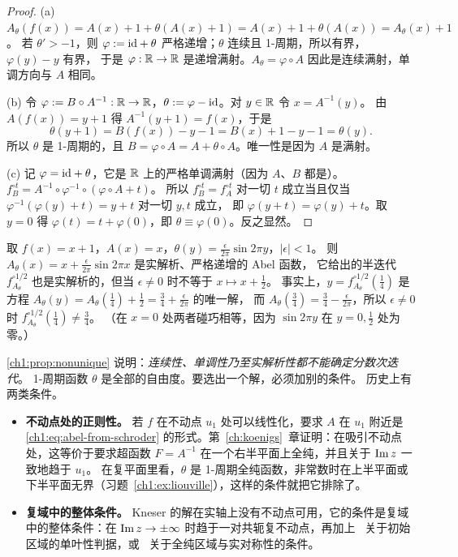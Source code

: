 \begin{proof}
(a) $A_\theta(f(x))=A(x)+1+\theta(A(x)+1)=A(x)+1+\theta(A(x))=A_\theta(x)+1$。
若 $\theta'>-1$，则 $\varphi:=\mathrm{id}+\theta$ 严格递增；$\theta$ 连续且 1-周期，所以有界，$\varphi(y)-y$ 有界，
于是 $\varphi:\mathbb{R}\to\mathbb{R}$ 是递增满射。$A_\theta=\varphi\circ A$ 因此是连续满射，单调方向与 $A$ 相同。

(b) 令 $\varphi:=B\circ A^{-1}:\mathbb{R}\to\mathbb{R}$，$\theta:=\varphi-\mathrm{id}$。对 $y\in\mathbb{R}$ 令 $x=A^{-1}(y)$。
由 $A(f(x))=y+1$ 得 $A^{-1}(y+1)=f(x)$，于是
\[
  \theta(y+1)=B(f(x))-y-1=B(x)+1-y-1=\theta(y).
\]
所以 $\theta$ 是 1-周期的，且 $B=\varphi\circ A=A+\theta\circ A$。唯一性是因为 $A$ 是满射。

(c) 记 $\varphi=\mathrm{id}+\theta$，它是 $\mathbb{R}$ 上的严格单调满射（因为 $A$、$B$ 都是）。
$f_B^{\circ t}=A^{-1}\circ\varphi^{-1}\circ(\varphi\circ A+t)$。
所以 $f_B^{\circ t}=f_A^{\circ t}$ 对一切 $t$ 成立当且仅当 $\varphi^{-1}(\varphi(y)+t)=y+t$ 对一切 $y,t$ 成立，
即 $\varphi(y+t)=\varphi(y)+t$。取 $y=0$ 得 $\varphi(t)=t+\varphi(0)$，即 $\theta\equiv\varphi(0)$。反之显然。
\end{proof}

\begin{example}[平移的非平凡半迭代]\label{ch1:ex:translation}
取 $f(x)=x+1$，$A(x)=x$，$\theta(y)=\frac{\epsilon}{2\pi}\sin2\pi y$，$|\epsilon|<1$。
则 $A_\theta(x)=x+\frac{\epsilon}{2\pi}\sin2\pi x$ 是实解析、严格递增的 Abel 函数，
它给出的半迭代 $f_{A_\theta}^{\circ1/2}$ 也是实解析的，但当 $\epsilon\ne0$ 时不等于 $x\mapsto x+\frac12$。
事实上，$y=f_{A_\theta}^{\circ1/2}(\tfrac14)$ 是方程 $A_\theta(y)=A_\theta(\tfrac14)+\tfrac12=\tfrac34+\frac{\epsilon}{2\pi}$ 的唯一解，
而 $A_\theta(\tfrac34)=\tfrac34-\frac{\epsilon}{2\pi}$，所以 $\epsilon\ne0$ 时 $f_{A_\theta}^{\circ1/2}(\tfrac14)\ne\tfrac34$。
（在 $x=0$ 处两者碰巧相等，因为 $\sin2\pi y$ 在 $y=0,\frac12$ 处为零。）
\end{example}

\cref{ch1:prop:nonunique} 说明：\emph{连续性、单调性乃至实解析性都不能确定分数次迭代}。
1-周期函数 $\theta$ 是全部的自由度。要选出一个解，必须加别的条件。
历史上有两类条件。
\begin{itemize}
\item \textbf{不动点处的正则性。} 若 $f$ 在不动点 $u_1$ 处可以线性化，要求 $A$ 在 $u_1$ 附近是 \eqref{ch1:eq:abel-from-schroder} 的形式。第~\ref{ch:koenigs}~章证明：在吸引不动点处，这等价于要求超函数 $F=A^{-1}$ 在一个右半平面上全纯，并且关于 $\operatorname{Im} z$ 一致地趋于 $u_1$。
  在复平面里看，$\theta$ 是 1-周期全纯函数，非常数时在上半平面或下半平面无界（习题~\ref{ch1:ex:liouville}），这样的条件就把它排除了。
\item \textbf{复域中的整体条件。} Kneser 的解在实轴上没有不动点可用，它的条件是复域中的整体条件：在 $\operatorname{Im} z\to\pm\infty$ 时趋于一对共轭复不动点，再加上~\cite{TrappmannKouznetsov2011} 关于初始区域的单叶性判据，或~\cite{PaulsenCowgill2017} 关于全纯区域与实对称性的条件。
\end{itemize}

